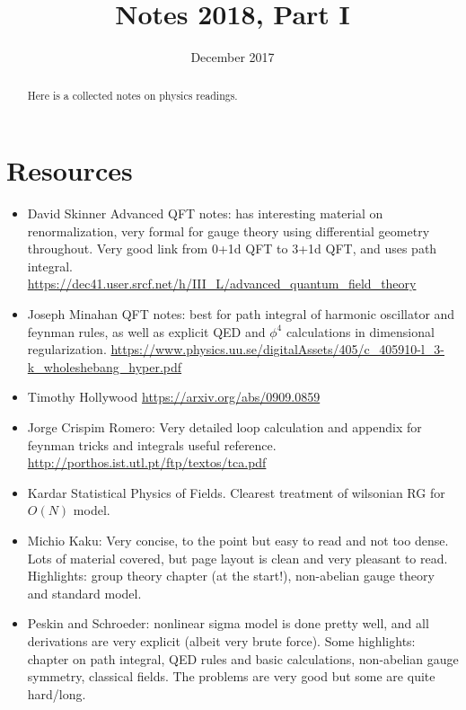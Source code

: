 \documentclass[11pt]{scrartcl}
\begin{document}
\title{Notes 2018, Part I} %
\date{December 2017}
\maketitle

\begin{abstract}
	\sffamily\small
	Here is a collected notes on physics readings.
\end{abstract}

\vspace{1em}

\tableofcontents
\newpage


\section{Resources}
\begin{itemize}
	\item David Skinner Advanced QFT notes: has interesting material on renormalization, very formal for gauge theory using differential geometry throughout.  Very good link from 0+1d QFT to 3+1d QFT, and uses path integral. \url{https://dec41.user.srcf.net/h/III_L/advanced_quantum_field_theory}
	\item Joseph Minahan QFT notes: best for path integral of harmonic oscillator and feynman rules, as well as explicit QED and $\phi^4$ calculations in dimensional regularization. \url{https://www.physics.uu.se/digitalAssets/405/c_405910-l_3-k_wholeshebang_hyper.pdf}
	\item Timothy Hollywood \url{https://arxiv.org/abs/0909.0859}
	\item Jorge Crispim Romero:  Very detailed loop calculation and appendix for feynman tricks and integrals useful reference. \url{http://porthos.ist.utl.pt/ftp/textos/tca.pdf}
	\item Kardar Statistical Physics of Fields.  Clearest treatment of wilsonian RG for $O(N)$ model.
	\item Michio Kaku: Very concise, to the point but easy to read and not too dense.  Lots of material covered, but page layout is clean and very pleasant to read.  Highlights: group theory chapter (at the start!), non-abelian gauge theory and standard model.
	\item Peskin and Schroeder: nonlinear sigma model is done pretty well, and all derivations are very explicit (albeit very brute force). Some highlights: chapter on path integral, QED rules and basic calculations, non-abelian gauge symmetry, classical fields.  The problems are very good but some are quite hard/long.

\end{itemize}
\end{document}
